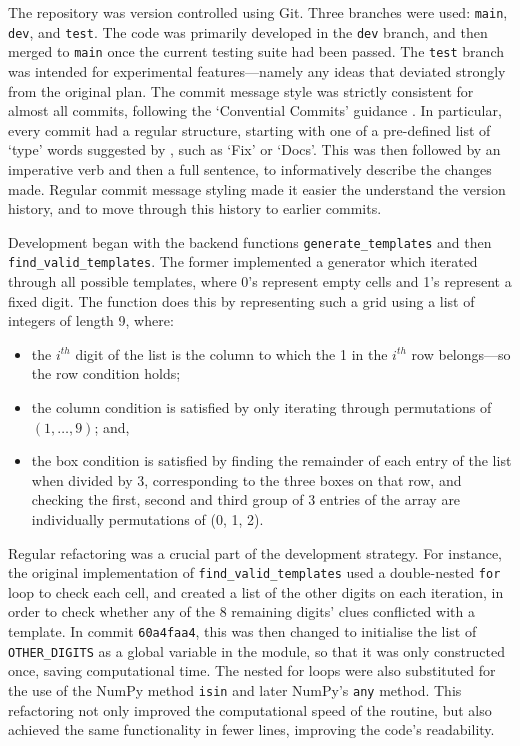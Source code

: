 \documentclass[12pt]{article}
\begin{document}
The repository was version controlled using Git.
Three branches were used: \texttt{main}, \texttt{dev}, and \texttt{test}.
The code was primarily developed in the \texttt{dev} branch, and then merged to \texttt{main} once the current testing suite had been passed.
The \texttt{test} branch was intended for experimental features---namely any ideas that deviated strongly from the original plan.
The commit message style was strictly consistent for almost all commits, following the `Convential Commits' guidance \cite{ccommits}.
In particular, every commit had a regular structure, starting with one of a pre-defined list of `type' words suggested by \cite{ccommits}, such as `Fix' or `Docs'.
This was then followed by an imperative verb and then a full sentence, to informatively describe the changes made.
Regular commit message styling made it easier the understand the version history, and to move through this history to earlier commits.

Development began with the backend functions \texttt{generate\_templates} and then \texttt{find\_valid\_templates}.
The former implemented a generator which iterated through all possible templates, where 0's represent empty cells and 1's represent a fixed digit.
The function does this by representing such a grid using a list of integers of length 9, where:
\begin{itemize}
    \item the $i^{th}$ digit of the list is the column to which the 1 in the $i^{th}$ row belongs---so the row condition holds;
    \item the column condition is satisfied by only iterating through permutations of $(1,\ldots,9)$; and,
    \item the box condition is satisfied by finding the remainder of each entry of the list when divided by 3, corresponding to the three boxes on that row, and checking the first, second and third group of 3 entries of the array are individually permutations of (0, 1, 2).
\end{itemize}

Regular refactoring was a crucial part of the development strategy.
For instance, the original implementation of \texttt{find\_valid\_templates} used a double-nested \texttt{for} loop to check each cell, and created a list of the other digits on each iteration, in order to check whether any of the 8 remaining digits' clues conflicted with a template.
In commit \texttt{60a4faa4}, this was then changed to initialise the list of \texttt{OTHER\_DIGITS} as a global variable in the module, so that it was only constructed once, saving computational time.
The nested for loops were also substituted for the use of the NumPy method \texttt{isin} and later NumPy's \texttt{any} method.
This refactoring not only improved the computational speed of the routine, but also achieved the same functionality in fewer lines, improving the code's readability.
\end{document}
